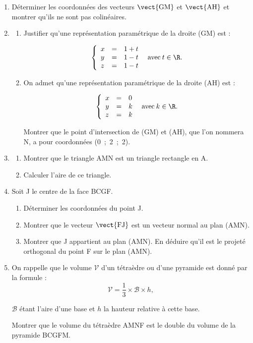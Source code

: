 \begin{enumerate}
\item Déterminer les coordonnées des vecteurs $\vect{\text{GM}}$ et $\vect{\text{AH}}$ et montrer qu'ils ne sont pas colinéaires.
\item
	\begin{enumerate}
		\item Justifier qu'une représentation paramétrique de la droite (GM) est :

\[\left\{\begin{array}{l c l}
x&=&1 + t\\
y&=&1 - t\\
z&=&1 - t
\end{array}\right. \:\text{ avec}\: t \in \R.\]

		\item On admet qu'une représentation paramétrique de la droite (AH) est :

\[\left\{\begin{array}{l c l}
x&=&0\\
y&=&k\\
z&=&k
\end{array}\right. \:\text{ avec}\: k \in \R.\]

Montrer que le point d'intersection de (GM) et (AH), que l'on nommera N, a pour
coordonnées (0~;~2~;~2).
	\end{enumerate}
\item
	\begin{enumerate}
		\item Montrer que le triangle AMN est un triangle rectangle en A.
		\item Calculer l'aire de ce triangle.
	\end{enumerate}
\item Soit J le centre de la face BCGF{}.
	\begin{enumerate}
		\item Déterminer les coordonnées du point J.
		\item Montrer que le vecteur $\vect{\text{FJ}}$ est un vecteur normal au plan (AMN).
		\item Montrer que J appartient au plan (AMN). En déduire qu'il est le projeté orthogonal du point F sur le plan (AMN).
	\end{enumerate}
\item On rappelle que le volume $\mathcal{V}$ d'un tétraèdre ou d'une pyramide est donné par la formule :
\[\mathcal{V} = \dfrac13 \times \mathcal{B} \times h,\]

$\mathcal{B}$ étant l'aire d'une base et $h$ la hauteur relative à cette base.

Montrer que le volume du tétraèdre AMNF est le double du volume de la pyramide BCGFM.
\end{enumerate}

\bigskip
